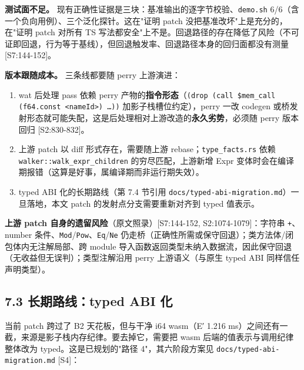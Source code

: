 \documentclass[11pt, a4paper]{article}
\begin{document}
\textbf{测试面不足。} 现有正确性证据是三块：基准输出的逐字节校验、\texttt{demo.sh} 6/6（含一个负向用例）、三个泛化探针。这在"证明 patch 没把基准改坏"上是充分的，在"证明 patch 对所有 TS 写法都安全"上不是。回退路径的存在降低了风险（不可证即回退，行为等于基线），但回退触发率、回退路径本身的回归面都没有测量 [S7:144-152]。


\textbf{版本跟随成本。} 三条线都要随 perry 上游演进：


\begin{enumerate}
\item wat 后处理 pass 依赖 perry 产物的\textbf{指令形态}（\texttt{(drop (call \$mem\_call (f64.const <nameId>) …))} 加影子栈槽位约定），perry 一改 codegen 或桥发射形态就可能失配，这是后处理相对上游改造的\textbf{永久劣势}，必须随 perry 版本回归 [S2:830-832]。
\item 上游 patch 以 diff 形式存在，需要随上游 rebase；\texttt{type\_facts.rs} 依赖 \texttt{walker::walk\_expr\_children} 的穷尽匹配，上游新增 Expr 变体时会在编译期报错（这算是好事，属编译期而非运行期失效）。
\item typed ABI 化的长期路线（第 7.4 节引用 \texttt{docs/typed-abi-migration.md}）一旦落地，本文 patch 的发射点分支需要重新对齐到 typed 值表示。
\end{enumerate}

\textbf{上游 patch 自身的遗留风险}（原文照录）[S7:144-152, S2:1074-1079]：字符串 \texttt{+}、number 条件、\texttt{Mod}/\texttt{Pow}、\texttt{Eq}/\texttt{Ne} 仍走桥（正确性所需或保守回退）；类方法体/闭包体内无注解局部、跨 module 导入函数返回类型未纳入数据流，因此保守回退（无收益但无误判）；类型注解沿用 perry 上游语义（与原生 typed ABI 同样信任声明类型）。


\subsection{7.3 长期路线：typed ABI 化}

当前 patch 跨过了 B2 天花板，但与干净 i64 wasm（E′ 1.216 ms）之间还有一截，来源是影子栈内存纪律。要去掉它，需要把 wasm 后端的值表示与调用纪律整体改为 typed。这是已规划的"路径 4"，其六阶段方案见 \texttt{docs/typed-abi-migration.md} [S4]：
\end{document}
